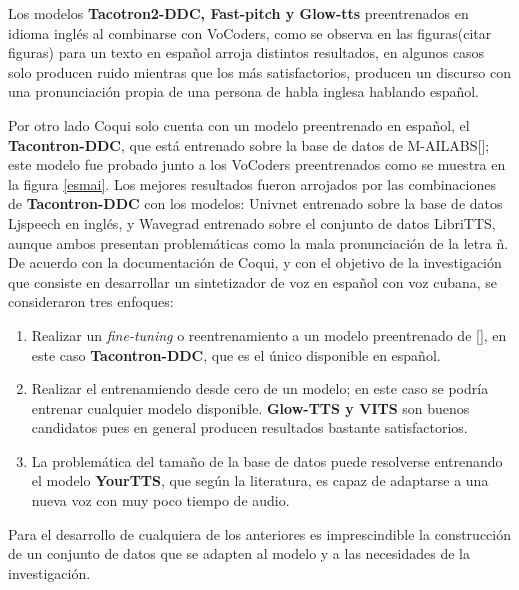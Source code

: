 Los modelos \textbf{Tacotron2-DDC, Fast-pitch y Glow-tts} preentrenados en idioma inglés al combinarse con VoCoders, como se observa en las figuras(citar figuras) para un texto en español arroja distintos resultados, en algunos casos solo producen ruido mientras que los más satisfactorios, producen un discurso con una pronunciación propia de una persona de habla inglesa hablando español.

Por otro lado Coqui solo cuenta con un modelo preentrenado en español, el \textbf{Tacontron-DDC}, que está entrenado sobre la base de datos de M-AILABS[\cite{mailabs}]; este modelo fue probado junto a los VoCoders preentrenados como se muestra en la figura \ref{esmai}. Los mejores resultados fueron arrojados por las combinaciones de \textbf{Tacontron-DDC} con los modelos: Univnet entrenado sobre la base de datos Ljspeech en inglés, y Wavegrad entrenado sobre el conjunto de datos LibriTTS, aunque ambos presentan problemáticas como la mala pronunciación de la letra ñ.\\

De acuerdo con la documentación de Coqui, y con el objetivo de la investigación que consiste en desarrollar un sintetizador de voz en español con voz cubana, se consideraron tres enfoques:

\begin{enumerate}
	\item Realizar un \textit{fine-tuning} o reentrenamiento a un modelo preentrenado de [\cite{coqui-doc}], en este caso \textbf{Tacontron-DDC}, que es el único disponible en español. 
	
	\item Realizar el entrenamiendo desde cero de un modelo; en este caso se podría entrenar cualquier modelo disponible. \textbf{Glow-TTS y VITS} son buenos candidatos pues en general producen resultados bastante satisfactorios.%
	
	\item La problemática del tamaño de la base de datos puede resolverse entrenando el modelo \textbf{YourTTS}, que según la literatura, es capaz de adaptarse a una nueva voz con muy poco tiempo de audio.
\end{enumerate}

Para el desarrollo de cualquiera de los anteriores es imprescindible la construcción de un conjunto de datos que se adapten al modelo y a las necesidades de la investigación.


